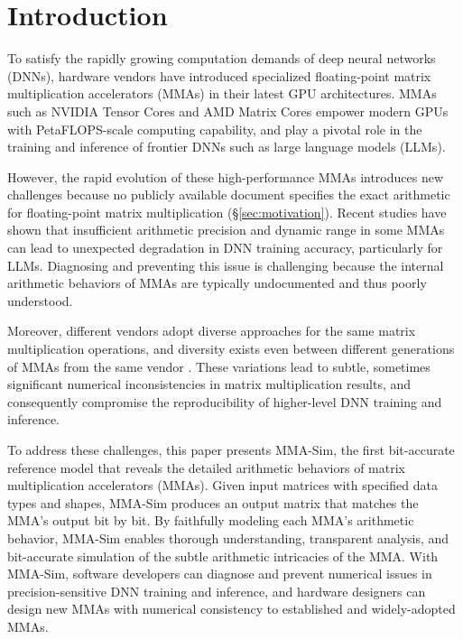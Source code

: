 \section{Introduction}

To satisfy the rapidly growing computation demands of deep neural networks (DNNs), hardware vendors have introduced specialized floating-point matrix multiplication accelerators (MMAs) in their latest GPU architectures. MMAs such as NVIDIA Tensor Cores \cite{markidis_nvidia_2018,sun_dissecting_2023} and AMD Matrix Cores \cite{schieffer_rise_2024} empower modern GPUs with PetaFLOPS-scale computing capability, and play a pivotal role in the training and inference of frontier DNNs such as large language models (LLMs).

However, the rapid evolution of these high-performance MMAs introduces new challenges because no publicly available document specifies the exact arithmetic for floating-point matrix multiplication (\S\ref{sec:motivation}).  
Recent studies \cite{deepseek-ai_deepseek-v3_2024,pytorch_developers_pytorch_2025} have shown that insufficient arithmetic precision and dynamic range in some MMAs can lead to unexpected degradation in DNN training accuracy, particularly for LLMs. Diagnosing and preventing this issue is challenging because the internal arithmetic behaviors of MMAs are typically undocumented and thus poorly understood.

Moreover, different vendors adopt diverse approaches for the same matrix multiplication operations, and diversity exists even between different generations of MMAs from the same vendor \cite{li_discovery_2024}. These variations lead to subtle, sometimes significant numerical inconsistencies in matrix multiplication results, and consequently compromise the reproducibility of higher-level DNN training and inference.

To address these challenges, this paper presents MMA-Sim, the first bit-accurate reference model that reveals the detailed arithmetic behaviors of matrix multiplication accelerators (MMAs). Given input matrices with specified data types and shapes, MMA-Sim produces an output matrix that matches the MMA’s output bit by bit. By faithfully modeling each MMA’s arithmetic behavior, MMA-Sim enables thorough understanding, transparent analysis, and bit-accurate simulation of the subtle arithmetic intricacies of the MMA. With MMA-Sim, software developers can diagnose and prevent numerical issues in precision-sensitive DNN training and inference, and hardware designers can design new MMAs with numerical consistency to established and widely-adopted MMAs.

